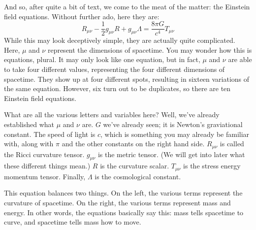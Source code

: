 And so, after quite a bit of text, we come to the meat of the matter: the Einstein field equations. Without further ado, here they are:
\begin{equation*}
R_{\mu\nu}-\frac{1}{2}g_{\mu\nu}R+g_{\mu\nu}\Lambda=\frac{8\pi G}{c^4}T_{\mu\nu}
\end{equation*}
While this may look deceptively simple, they are actually quite complicated. Here, $\mu$ and $\nu$ represent the dimensions of spacetime.
You may wonder how this is equations, plural. It may only look like one equation, but in fact, $\mu$ and $\nu$ are able to take 
four different values, representing the four different dimensions of spacetime. They show up at four different spots, resulting in 
sixteen variations of the same equation. However, six turn out to be duplicates, so there are ten Einstein field equations.

What are all the various letters and variables here? Well, we've already established what $\mu$ and $\nu$ are. $G$ we've already seen;
it is Newton's graviational constant. The speed of light is $c$, which is something you may already be familiar with, along with $\pi$
and the other constants on the right hand side. $R_{\mu\nu}$ is called the Ricci curvature tensor. $g_{\mu\nu}$ is the metric tensor.
(We will get into later what these different things mean.) $R$ is the curvature scalar. $T_{\mu\nu}$ is the stress energy momentum tensor.
Finally, $\Lambda$ is the cosmological constant.

This equation balances two things. On the left, the various terms represent the curvature of spacetime. On the right, the various terms
represent mass and energy. In other words, the equations basically say this: mass tells spacetime to curve, and spacetime tells mass
how to move.
